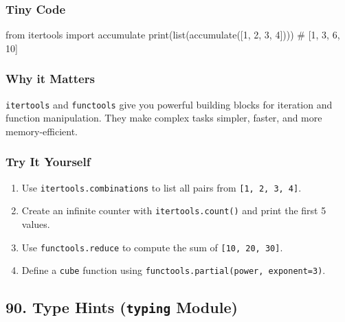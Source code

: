 \documentclass[
  letterpaper,
  DIV=11,
  numbers=noendperiod]{scrreprt}
\newenvironment{Shaded}{\begin{snugshade}}{\end{snugshade}}
\newcommand{\BuiltInTok}[1]{\textcolor[rgb]{0.00,0.23,0.31}{#1}}
\newcommand{\CommentTok}[1]{\textcolor[rgb]{0.37,0.37,0.37}{#1}}
\newcommand{\DecValTok}[1]{\textcolor[rgb]{0.68,0.00,0.00}{#1}}
\newcommand{\ImportTok}[1]{\textcolor[rgb]{0.00,0.46,0.62}{#1}}
\newcommand{\NormalTok}[1]{\textcolor[rgb]{0.00,0.23,0.31}{#1}}
\providecommand{\tightlist}{%
  \setlength{\itemsep}{0pt}\setlength{\parskip}{0pt}}
\begin{document}
\subsubsection{Tiny Code}\label{tiny-code-88}

\begin{Shaded}
\begin{Highlighting}[]
\ImportTok{from}\NormalTok{ itertools }\ImportTok{import}\NormalTok{ accumulate}
\BuiltInTok{print}\NormalTok{(}\BuiltInTok{list}\NormalTok{(accumulate([}\DecValTok{1}\NormalTok{, }\DecValTok{2}\NormalTok{, }\DecValTok{3}\NormalTok{, }\DecValTok{4}\NormalTok{])))  }\CommentTok{\# [1, 3, 6, 10]}
\end{Highlighting}
\end{Shaded}

\subsubsection{Why it Matters}\label{why-it-matters-88}

\texttt{itertools} and \texttt{functools} give you powerful building
blocks for iteration and function manipulation. They make complex tasks
simpler, faster, and more memory-efficient.

\subsubsection{Try It Yourself}\label{try-it-yourself-88}

\begin{enumerate}
\def\labelenumi{\arabic{enumi}.}
\tightlist
\item
  Use \texttt{itertools.combinations} to list all pairs from
  \texttt{{[}1,\ 2,\ 3,\ 4{]}}.
\item
  Create an infinite counter with \texttt{itertools.count()} and print
  the first 5 values.
\item
  Use \texttt{functools.reduce} to compute the sum of
  \texttt{{[}10,\ 20,\ 30{]}}.
\item
  Define a \texttt{cube} function using
  \texttt{functools.partial(power,\ exponent=3)}.
\end{enumerate}

\subsection{\texorpdfstring{90. Type Hints (\texttt{typing}
Module)}{90. Type Hints (typing Module)}}\label{type-hints-typing-module}
\end{document}
